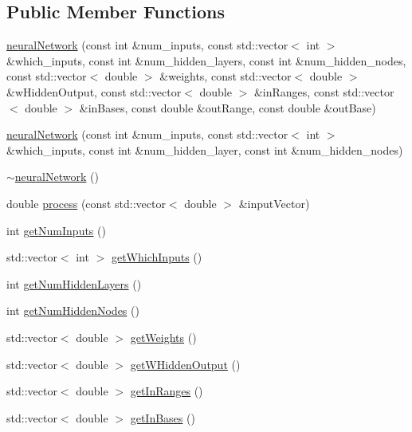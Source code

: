\subsection*{Public Member Functions}
\begin{DoxyCompactItemize}
\item 
\hyperlink{classneural_network_a56aa499b1f9aaa80c7c21d41dce96f4e}{neural\+Network} (const int \&num\+\_\+inputs, const std\+::vector$<$ int $>$ \&which\+\_\+inputs, const int \&num\+\_\+hidden\+\_\+layers, const int \&num\+\_\+hidden\+\_\+nodes, const std\+::vector$<$ double $>$ \&weights, const std\+::vector$<$ double $>$ \&w\+Hidden\+Output, const std\+::vector$<$ double $>$ \&in\+Ranges, const std\+::vector$<$ double $>$ \&in\+Bases, const double \&out\+Range, const double \&out\+Base)
\item 
\hyperlink{classneural_network_a4a43fb0fb07a2cde9234fd1b4dbc7f91}{neural\+Network} (const int \&num\+\_\+inputs, const std\+::vector$<$ int $>$ \&which\+\_\+inputs, const int \&num\+\_\+hidden\+\_\+layer, const int \&num\+\_\+hidden\+\_\+nodes)
\item 
\hyperlink{classneural_network_a0967982cb0345a610f78d225d812086f}{$\sim$neural\+Network} ()
\item 
double \hyperlink{classneural_network_a2d93cf6790db969ea067e8588b10d204}{process} (const std\+::vector$<$ double $>$ \&input\+Vector)
\item 
int \hyperlink{classneural_network_aaf9ff8b1a88126fcffc1e9f07a4ffe49}{get\+Num\+Inputs} ()
\item 
std\+::vector$<$ int $>$ \hyperlink{classneural_network_afc93cb28c3897d4d1faa4ac8fbf0c1f8}{get\+Which\+Inputs} ()
\item 
int \hyperlink{classneural_network_ade72f91a9207f52618f9b70cb585a992}{get\+Num\+Hidden\+Layers} ()
\item 
int \hyperlink{classneural_network_a679a628a34f70dd52f781c8c9dbd1a02}{get\+Num\+Hidden\+Nodes} ()
\item 
std\+::vector$<$ double $>$ \hyperlink{classneural_network_a9822cd69469d7b2a946a9f87c8bebe5f}{get\+Weights} ()
\item 
std\+::vector$<$ double $>$ \hyperlink{classneural_network_ac372190f6eabf0af27e5c317f2a1d51b}{get\+W\+Hidden\+Output} ()
\item 
std\+::vector$<$ double $>$ \hyperlink{classneural_network_a876638749a0c7027e82da294947f1840}{get\+In\+Ranges} ()
\item 
std\+::vector$<$ double $>$ \hyperlink{classneural_network_af3fdc1c2bdf4794680ccc4cd845fb47e}{get\+In\+Bases} ()

\end{DoxyCompactItemize}
